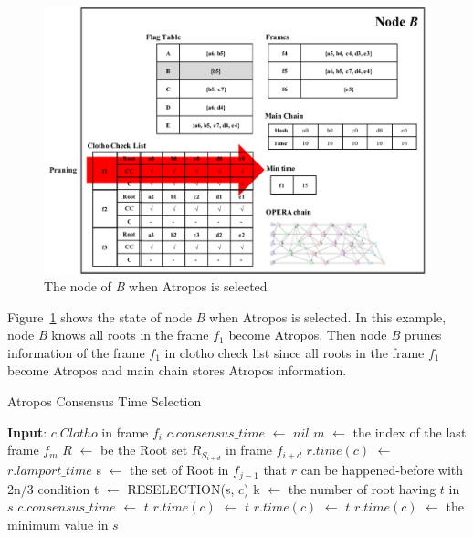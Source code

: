 \documentclass{article}
\begin{document}
\begin{figure}[h] \centering  
	\includegraphics[width=0.8\columnwidth]{Atropos_fig2.pdf}
	\caption{The node of \textit{B} when Atropos is selected}
	\label{fig:Atropos_Node}
\end{figure}

\newpage
Figure~\ref{fig:Atropos_Node} shows the state of node \textit{B} when Atropos is selected. In this example, node \textit{B} knows all roots in the frame $f_1$ become Atropos. Then node \textit{B} prunes 
information of the frame $f_1$ in clotho check list since all roots in the frame $f_1$ become Atropos and main chain stores Atropos information. 

\begin{algorithm}
\caption{Atropos Consensus Time Selection}\label{al:atc}
\begin{algorithmic}[1]
	\State \textbf{Input}: $c.Clotho$ in frame $f_i$
	\State$c.consensus\_time$ $\leftarrow$ $nil$
	\State$m$ $\leftarrow$ the index of the last frame $f_m$
	\State $R$ $\leftarrow$ be the Root set $R_{S_{i+d}}$ in frame $f_{i+d}$
	\State $r.time(c)$ $\leftarrow$ $r.lamport\_time$
	\EndIf
	\State s $\leftarrow$ the set of Root in $f_{j-1}$ that $r$ can be  happened-before with 2n/3 condition
	\State t $\leftarrow$ RESELECTION(s, $c$)
	\State k $\leftarrow$ the number of root having $t$ in $s$
	\State $c.consensus\_time$ $\leftarrow$ $t$
	\State $r.time(c)$ $\leftarrow$ $t$
	\Else
	\State $r.time(c)$ $\leftarrow$ $t$
	\EndIf
	\Else
	\State $r.time(c)$ $\leftarrow$ the minimum value in $s$
	\EndIf
	\EndIf
	\EndFor
	\EndFor
	\EndProcedure
\end{algorithmic}
\end{algorithm}
\end{document}
